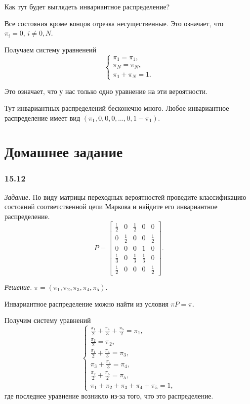 Как тут будет выглядеть инвариантное распределение?

Все состояния кроме концов отрезка несущественные.
Это означает, что $ \pi_i = 0, \, i \neq 0, N$.

Получаем систему уравненеий
\begin{equation*}
  \begin{cases}
    \pi_1 = \pi_1, \\
    \pi_N = \pi_N, \\
    \pi_1 + \pi_N = 1.
  \end{cases}
\end{equation*}

Это означает, что у нас только одно уравнение на эти вероятности.

Тут инвариантных распределений бесконечно много.
Любое инвариантное распределение имеет вид $ \left( \pi_1, 0, 0, 0, \dotsc, 0, 1 - \pi_1 \right) $.

\section*{Домашнее задание}

\subsubsection*{15.12}

\textit{Задание.}
По виду матрицы переходных вероятностей проведите классификацию состояний соответственной цепи
Маркова и найдите его инвариантное распределение.
\begin{equation*}
  P =
  \begin{bmatrix}
    \frac{1}{2} & 0 & \frac{1}{2} & 0 & 0 \\
    0 & \frac{1}{2} & 0 & 0 & \frac{1}{2} \\
    0 & 0 & 0 & 1 & 0 \\
    \frac{1}{3} & 0 & \frac{1}{3} & \frac{1}{3} & 0 \\
    \frac{1}{2} & 0 & 0 & 0 & \frac{1}{2}
  \end{bmatrix}.
\end{equation*}

\textit{Решение.}
$ \pi = \left( \pi_1, \pi_2, \pi_3, \pi_4, \pi_5 \right) $.

Инвариантное распределение можно найти из условия $ \pi P = \pi $.

Получим систему уравнений
\begin{equation*}
  \begin{cases}
    \frac{ \pi_1}{2} + \frac{ \pi_4}{3} + \frac{ \pi_5}{2} = \pi_1, \\
    \frac{ \pi_2}{2} = \pi_2, \\
    \frac{ \pi_1}{2} + \frac{ \pi_4}{3} = \pi_3, \\
    \pi_3 + \frac{ \pi_4}{3} = \pi_4, \\
    \frac{ \pi_2}{2} + \frac{ \pi_5}{2} = \pi_5, \\
    \pi_1 + \pi_2 + \pi_3 + \pi_4 + \pi_5 = 1,
  \end{cases}
\end{equation*}
где последнее уравнение возникло из-за того, что это распределение.

